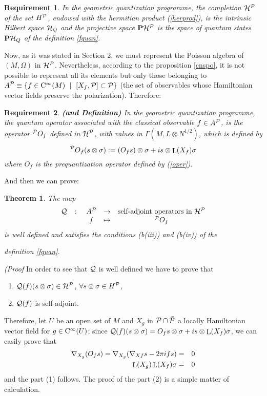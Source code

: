 \documentclass[12pt]{article}
\newtheorem{teor}{Theorem}
\newtheorem{require}{Requirement}
\def\beann{\begin{eqnarray*}}
\def\eeann{\end{eqnarray*}}
\def\Lie{\mathop{\rm L}\nolimits}
\def\Cinfty{{\rm C}^\infty}
\begin{document}
\begin{require}
In the geometric quantization programme, the completion ${\cal H}^{\cal
P}$
of the set $H^{\cal P}$, endowed with the hermitian product
(\ref{herprod}), is the intrinsic Hilbert space ${\cal H}_Q$
and the projective space ${\bf P}{\cal H}^{\cal P}$
is the space of quantum states ${\bf P}{\cal H}_Q$ of the definition
\ref{fquan}.
\end{require}

Now, as it was stated in Section 2, we must represent the Poisson
algebra of
$(M,\Omega )$ in ${\cal H}^{\cal P}$.
Nevertheless, according to the proposition \ref{cnspo},
it is not possible to represent
all its elements but only those belonging to
$A^{\cal P} \equiv\{ f \in \Cinfty (M) \ \mid \ [X_f,\cal P] \subset
\cal P \}$
(the set of observables whose Hamiltonian vector fields preserve the
polarization).
Therefore:

\begin{require}
{\bf (and Definition)}
In the geometric quantization programme,
the quantum operator associated with the classical observable
$f \in A^{\cal P}$, is the operator $^{\cal P}O_f$ defined in ${\cal
H}^{\cal P}$,
with values in $\Gamma (M,L \otimes N^{1/2})$, which is defined by
$$
^{\cal P}O_f (s \otimes \sigma) :=
(O_f s)\otimes \sigma + i s \otimes \Lie(X_f)\sigma
$$
where $O_f$ is the prequantization operator defined by (\ref{oper}).
\end{require}

And then we can prove:

\begin{teor}
The map
$$
\begin{array}{ccccc}
{\cal Q} & \colon & A^{\cal P} & \to &
\mbox{{\rm self-adjoint operators in} ${\cal H}^{\cal P}$}
\\
& & f & \mapsto & ^{\cal P}O_f
\end{array}
$$
is well defined and satisfies the conditions (b(iii)) and (b(iv)) of the

definition \ref{fquan}.
\end{teor}
{\it (Proof} \quad
In order to see that ${\cal Q}$ is well defined we have to prove that
\begin{enumerate}
\item
${\cal Q}(f)(s \otimes \sigma) \in {\cal H}^{\cal P}$,
$\forall s \otimes \sigma\in H^{\cal P}$,
\item
${\cal Q}(f)$ is self-adjoint.
\end{enumerate}
Therefore, let $U$ be an open set of $M$ and $X_g$ in ${\cal P}
\cap \bar {\cal P}$ a locally Hamiltonian vector field for $g \in
\Cinfty (U)$;
 since ${\cal Q}(f)(s \otimes \sigma)
 =O_f s \otimes\sigma + i s \otimes
\Lie(X_f)\sigma$, we can easily prove that \beann \nabla_{X_g}(O_f
s) = \nabla_{X_g}(\nabla_{Xf}s-2 \pi i f s) &=& 0
\\
\Lie(X_g)\Lie(X_f)\sigma &=& 0
\eeann
and the part (1) follows. The proof of the part (2) is a simple matter
of calculation.
\end{document}
